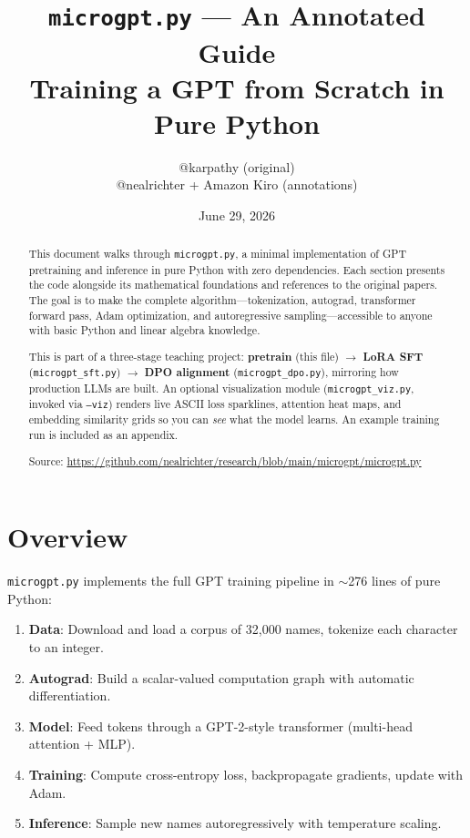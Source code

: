 \documentclass[11pt,a4paper]{article}
\title{\texttt{microgpt.py} --- An Annotated Guide\\[0.3em]
\large Training a GPT from Scratch in Pure Python}
\author{@karpathy (original) \\ @nealrichter + Amazon Kiro (annotations)}
\date{June 29, 2026}
\begin{document}
\pagestyle{fancy}
\fancyhf{}
\fancyfoot[C]{\thepage}
\maketitle

\begin{abstract}
This document walks through \texttt{microgpt.py}, a minimal implementation of GPT pretraining and inference in pure Python with zero dependencies. Each section presents the code alongside its mathematical foundations and references to the original papers. The goal is to make the complete algorithm---tokenization, autograd, transformer forward pass, Adam optimization, and autoregressive sampling---accessible to anyone with basic Python and linear algebra knowledge.

This is part of a three-stage teaching project: \textbf{pretrain} (this file) $\to$ \textbf{LoRA SFT} (\texttt{microgpt\_sft.py}) $\to$ \textbf{DPO alignment} (\texttt{microgpt\_dpo.py}), mirroring how production LLMs are built. An optional visualization module (\texttt{microgpt\_viz.py}, invoked via \texttt{--viz}) renders live ASCII loss sparklines, attention heat maps, and embedding similarity grids so you can \textit{see} what the model learns. An example training run is included as an appendix.

\medskip
\noindent Source: \url{https://github.com/nealrichter/research/blob/main/microgpt/microgpt.py}
\end{abstract}

\tableofcontents

\section{Overview}

\texttt{microgpt.py} implements the full GPT training pipeline in $\sim$276 lines of pure Python:

\begin{enumerate}
  \item \textbf{Data}: Download and load a corpus of 32{,}000 names, tokenize each character to an integer.
  \item \textbf{Autograd}: Build a scalar-valued computation graph with automatic differentiation.
  \item \textbf{Model}: Feed tokens through a GPT-2-style transformer (multi-head attention + MLP).
  \item \textbf{Training}: Compute cross-entropy loss, backpropagate gradients, update with Adam.
  \item \textbf{Inference}: Sample new names autoregressively with temperature scaling.
\end{enumerate}
\end{document}
